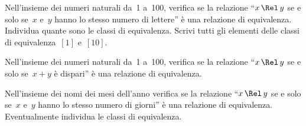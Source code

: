 \begin{multicols}{2}
\begin{esercizio}
\label{ese:\thechapter.35}
Nell'insieme dei numeri naturali da~1 a~100, verifica se la relazione ``$x \,\Rel\, y$ se e solo se~$x$ e~$y$ hanno lo stesso numero di lettere''
è una relazione di equivalenza. Individua quante sono le classi di equivalenza.
Scrivi tutti gli elementi delle classi di equivalenza~$[1]$ e~$[10]$.
\end{esercizio}

\begin{esercizio}
\label{ese:\thechapter.36}
Nell'insieme dei numeri naturali da~1 a~100, verifica se la relazione ``$x \,\Rel\, y$ se e solo se~$x+y$ è
dispari'' è una relazione di equivalenza.
\end{esercizio}

\begin{esercizio}
\label{ese:\thechapter.37}
Nell'insieme dei nomi dei mesi dell'anno verifica se la relazione ``$x \,\Rel\, y$ se e solo se~$x$ e~$y$ hanno lo stesso numero di giorni''
è una relazione di equivalenza. Eventualmente individua le classi di equivalenza.
\end{esercizio}

\end{multicols}

